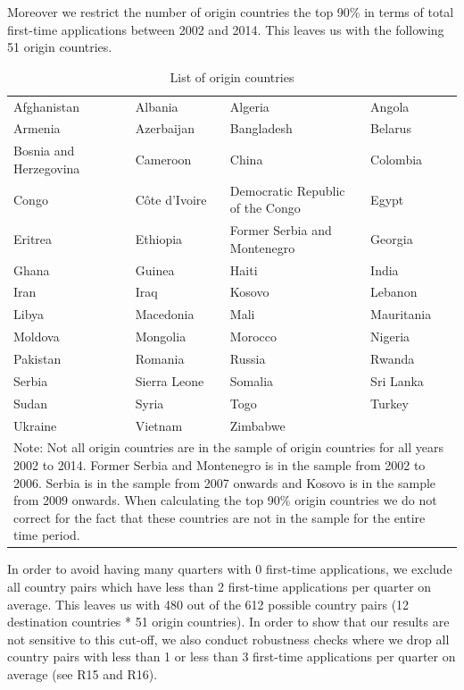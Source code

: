 \documentclass[11pt,a4paper]{scrartcl}
\begin{document}
Moreover we restrict the number of origin countries the top 90\% in terms of total first-time applications between 2002 and 2014. This leaves us with the following 51 origin countries. 

\begin{table}[!ht]\centering \footnotesize
	\caption{List of origin countries}
	\begin{tabular}{l l l l}
		\hline \hline
		Afghanistan & Albania & 	Algeria & 	Angola \\
		\smallskip
		Armenia & 	Azerbaijan & 	Bangladesh & Belarus \\
		\smallskip
		Bosnia and Herzegovina & 	Cameroon & 	China & Colombia \\
		\smallskip
		Congo & 	Côte d'Ivoire & Democratic Republic of the Congo & 	Egypt \\
		\smallskip
		Eritrea & 	Ethiopia & 	Former Serbia and Montenegro & 	Georgia  \\
		\smallskip
		Ghana & Guinea & 	Haiti & India \\
		\smallskip
		Iran &  Iraq &  Kosovo & Lebanon \\
		\smallskip
		Libya & Macedonia & Mali & 	Mauritania \\
		\smallskip
		Moldova & 	Mongolia & 	Morocco & 	Nigeria \\
		\smallskip
		Pakistan & 	Romania & 	Russia & 	Rwanda \\
		\smallskip
		Serbia & Sierra Leone & Somalia & Sri Lanka \\
		\smallskip
		Sudan & Syria & Togo & Turkey \\
		\smallskip
		Ukraine & 	Vietnam & 	Zimbabwe & \\
		\hline \hline
		\multicolumn{4}{p{14.3cm}}{Note: Not all origin countries are in the sample of origin countries for all years 2002 to 2014. Former Serbia and Montenegro is in the sample from 2002 to 2006. Serbia is in the sample from 2007 onwards and Kosovo is in the sample from 2009 onwards. When calculating the top 90\% origin countries we do not correct for the fact that these countries are not in the sample for the entire time period. }
	\end{tabular}
\end{table}

In order to avoid having many quarters with 0 first-time applications, we exclude all country pairs which have less than 2 first-time applications per quarter on average. This leaves us with 480 out of the 612 possible country pairs (12 destination countries * 51 origin countries). In order to show that our results are not sensitive to this cut-off, we also conduct robustness checks where we drop all country pairs with less than 1 or less than 3 first-time applications per quarter on average (see R15 and R16).
\end{document}
